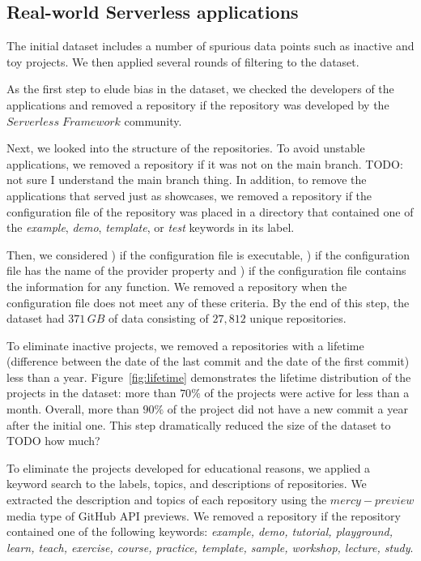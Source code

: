 \subsection{Real-world Serverless applications} \label{phaseB}
The initial dataset includes a number of spurious data points 
such as inactive and toy projects. We then applied several rounds 
of filtering to the dataset.

As the first step to elude bias in the dataset, we checked the developers 
of the applications and removed a repository if the repository was developed 
by the $Serverless \; Framework$ community. 

Next, we looked into the structure of the repositories. 
To avoid unstable applications, we removed a repository if it was not 
on the main branch. 
TODO: not sure I understand the main branch thing.
In addition, to remove the applications that served 
just as showcases, we removed a repository if the configuration file 
of the repository was placed in a directory that contained one of the 
\emph{example}, \emph{demo}, \emph{template}, or \emph{test} 
keywords in its label.

Then, 
we considered ) if the configuration file is executable, ) if 
the configuration file has the name of the provider property and 
) if the configuration file contains the information for any 
function. We removed a repository when the configuration file
does not meet any of these criteria. 
%
By the end of this step, the dataset had $371 \, GB$ of data consisting 
of $27,812$ unique repositories. 

To eliminate inactive projects, we removed a repositories with a lifetime 
(difference between the date of the last commit and the date of the first commit)
less than a year. 
Figure~\ref{fig:lifetime} demonstrates the lifetime distribution of the 
projects in the dataset: more than $70\%$ of the projects 
were active for less than a month. Overall, more than $90\%$ 
of the project did not have a new commit a year after the initial one. 
This step dramatically reduced the size of the dataset to TODO how much?

To eliminate the projects developed for educational reasons, 
we applied a keyword search to the labels, topics, and 
descriptions of repositories. We extracted the description 
and topics of each repository using the $mercy-preview$ media 
type of GitHub API previews. We removed a repository 
if the repository contained one of the following keywords: 
\emph{example, demo, tutorial, playground, learn, teach, exercise, 
	course, practice, template, sample, workshop, lecture, study}.

